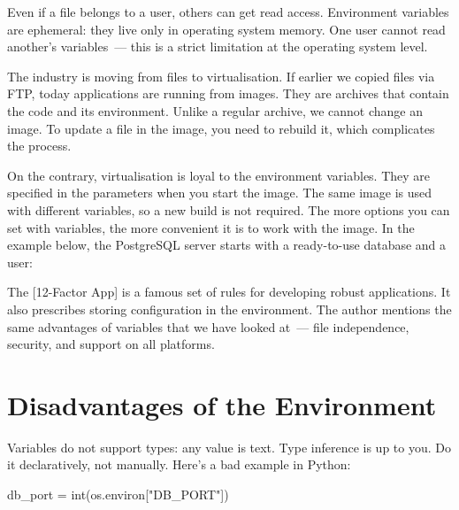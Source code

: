 Even if a file belongs to a user, others can get read access. Environment variables are ephemeral: they live only in operating system memory. One user cannot read another's variables~--- this is a strict limitation at the operating system level.


The industry is moving from files to virtualisation. If earlier we copied files via FTP, today applications are running from images. They are archives that contain the code and its environment. Unlike a regular archive, we cannot change an image. To update a file in the image, you need to rebuild it, which complicates the process.


On the contrary, virtualisation is loyal to the environment variables. They are specified in the parameters when you start the image. The same image is used with different variables, so a new build is not required. The more options you can set with variables, the more convenient it is to work with the image. In the example below, the PostgreSQL server starts with a ready-to-use database and a user:



The [12-Factor App] is a famous set of rules for developing robust applications. It also prescribes storing configuration in the environment. The author mentions the same advantages of variables that we have looked at~--- file independence, security, and support on all platforms.

\section{Disadvantages of the Environment}

\index{declarativity}

Variables do not support types: any value is text. Type inference is up to you. Do it declaratively, not manually. Here's a bad example in Python:


\begin{python}
db_port = int(os.environ["DB_PORT"])
\end{python}

